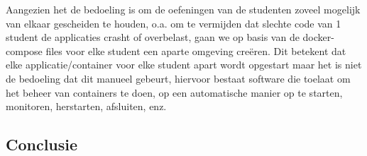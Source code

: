 Aangezien het de bedoeling is om de oefeningen van de studenten zoveel mogelijk van elkaar gescheiden te houden, o.a. om te vermijden dat slechte code van 1 student de applicaties crasht of overbelast, gaan we op basis van de docker-compose files voor elke student een aparte omgeving creëren. Dit betekent dat elke applicatie/container voor elke student apart wordt opgestart maar het is niet de bedoeling dat dit manueel gebeurt, hiervoor bestaat software die toelaat om het beheer van containers te doen, op een automatische manier op te starten, monitoren, herstarten, afsluiten, enz.



\subsection{Conclusie}

